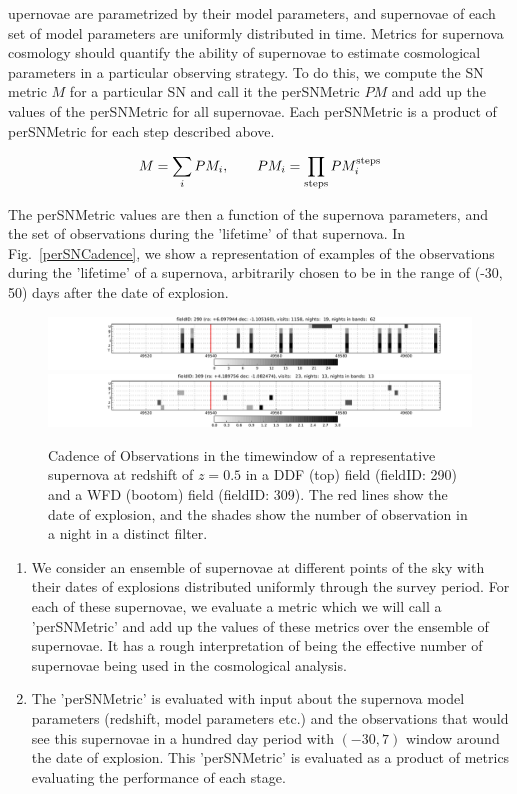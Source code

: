 upernovae are parametrized by their model parameters, and supernovae of each
set of model parameters are uniformly distributed in time.
Metrics for supernova cosmology should quantify the ability of supernovae 
to estimate cosmological parameters in a particular observing strategy. 
To do this, we compute the SN metric $M$ for a particular SN and call it the 
perSNMetric $PM$ and add up the values of the perSNMetric for all supernovae. 
Each perSNMetric is a product of perSNMetric for each step described above.

\begin{equation}
M = \sum_i PM_i, \qquad PM_i = \prod_{\rm{steps}} PM_i^{\rm{steps}}
\end{equation}

The perSNMetric values are then a function of the supernova parameters, and the set of observations during the 'lifetime' of that supernova. 
In Fig.~\ref{perSNCadence}, we show a representation of examples of the observations during the 'lifetime' of a supernova, arbitrarily chosen to be in the range of (-30, 50) days after the date of explosion.
\begin{figure}[tbh!]
\includegraphics[angle=0,width=\textwidth,clip]{figs/SN_Cadence_290.pdf}
\includegraphics[angle=0,width=\textwidth,clip]{figs/SN_Cadence_309.pdf}
\caption{Cadence of Observations in the timewindow of a representative supernova at redshift of $z=0.5$ in a DDF (top) field (fieldID: 290) and a WFD (bootom) field (fieldID: 309). The red lines show the date of explosion, and the shades show the number of observation in a night in a distinct filter.}
\label{fig:perSNCadence}
\end{figure}


\begin{enumerate}
\item We consider an ensemble of supernovae at different points of the sky with  their dates of explosions distributed uniformly through the survey period. For each of these supernovae, we evaluate a metric which we will call a 'perSNMetric' and add up the values of these metrics over the ensemble of supernovae. It has a rough interpretation of being the effective number of supernovae being used in the cosmological analysis.
\item The 'perSNMetric' is evaluated with input about the supernova model parameters (redshift, model parameters etc.) and the observations that would see this supernovae in a hundred day period with $(-30, 7)$ window around the date of
explosion. This 'perSNMetric' is evaluated as a product of metrics evaluating
the performance of each stage. 
\end{enumerate}
